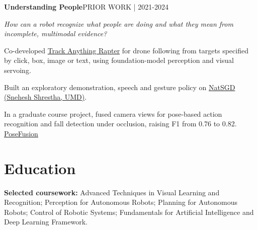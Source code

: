 \documentclass[10pt]{article}
\newcommand{\thread}[3]{\par\vspace{4pt}\textbf{#1}\hfill{\scriptsize #2}\par\textit{#3}\par}
\renewcommand{\evidence}[2]{\nobreak\hspace{0.15em}\mbox{\footnotesize\href{#1}{#2}}}
\begin{document}
\thread{Understanding People}{PRIOR WORK | 2021-2024}{How can a robot recognize what people are doing and what they mean from incomplete, multimodal evidence?}
\begin{compactitems}
\item Co-developed \href{https://arxiv.org/abs/2405.11655}{Track Anything Rapter} for drone following from targets specified by click, box, image or text, using foundation-model perception and visual servoing.
\item Built an exploratory demonstration, speech and gesture policy on \href{https://tvpian.github.io/projects/natsgd/}{NatSGD (Snehesh Shrestha, UMD)}.
\item In a graduate course project, fused camera views for pose-based action recognition and fall detection under occlusion, raising F1 from 0.76 to 0.82. \evidence{https://tvpian.github.io/projects/multimodal-perception/}{PoseFusion}
\end{compactitems}
\section{Education}
\par\vspace{3pt}\textbf{Selected coursework:} Advanced Techniques in Visual Learning and Recognition; Perception for Autonomous Robots; Planning for Autonomous Robots; Control of Robotic Systems; Fundamentals for Artificial Intelligence and Deep Learning Framework.
\par\vspace{4pt}
\newpage
\end{document}
